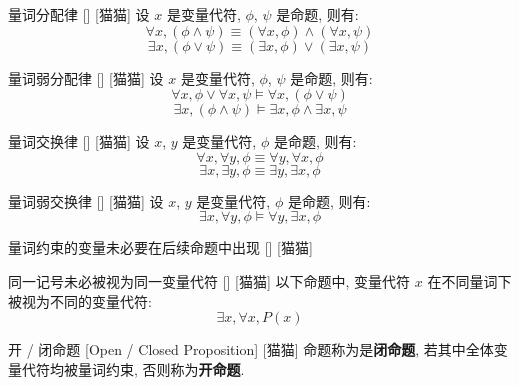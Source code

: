 \documentclass[UTF8]{ctexart}
\begin{document}
            \begin{ppt}
                []
                {量词分配律}
                []
                [猫猫]
                设 \(x\) 是变量代符, \(\phi\), \(\psi\) 是命题, 则有: 
                \[\forall x, (\phi\land\psi)\equiv(\forall x, \phi)\land(\forall x, \psi)\]
                \[\exists x, (\phi\lor\psi)\equiv(\exists x, \phi)\lor(\exists x, \psi)\]
            \end{ppt}

            \begin{ppt}
                []
                {量词弱分配律}
                []
                [猫猫]
                设 \(x\) 是变量代符, \(\phi\), \(\psi\) 是命题, 则有: 
                \[\forall x, \phi\lor\forall x, \psi\models\forall x, (\phi\lor\psi)\]
                \[\exists x, (\phi\land\psi)\models\exists x, \phi\land\exists x, \psi\]
            \end{ppt}

            \begin{ppt}
                []
                {量词交换律}
                []
                [猫猫]
                设 \(x\), \(y\) 是变量代符, \(\phi\) 是命题, 则有: 
                \[\forall x, \forall y, \phi\equiv\forall y, \forall x, \phi\]
                \[\exists x, \exists y, \phi\equiv\exists y, \exists x, \phi\]
            \end{ppt}

            \begin{ppt}
                []
                {量词弱交换律}
                []
                [猫猫]
                设 \(x\), \(y\) 是变量代符, \(\phi\) 是命题, 则有: 
                \[\exists x, \forall y, \phi\models\forall y, \exists x, \phi\]
            \end{ppt}

            \begin{cxmp}
                []
                {量词约束的变量未必要在后续命题中出现}
                []
                [猫猫]
            \end{cxmp}

            \begin{cxmp}
                []
                {同一记号未必被视为同一变量代符}
                []
                [猫猫]
                以下命题中, 变量代符 \(x\) 在不同量词下被视为不同的变量代符: 
                \[\exists x, \forall x, P(x)\]
            \end{cxmp}

            \begin{dfn}
                []
                {开 / 闭命题}
                [Open / Closed Proposition]
                [猫猫]
                命题称为是\textbf{闭命题}, 若其中全体变量代符均被量词约束, 否则称为\textbf{开命题}. 
            \end{dfn}
\end{document}
